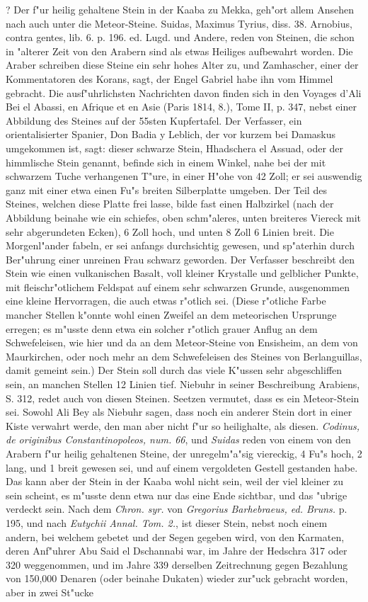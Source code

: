 \documentclass[a4paper, 11pt, oneside, polutonikogreek, german]{article}
\begin{document}
? Der f"ur heilig gehaltene Stein in der Kaaba zu Mekka, geh"ort allem Ansehen nach auch unter die Meteor-Steine. Suidas, Maximus Tyrius, diss. 38. Arnobius, contra gentes, lib. 6. p. 196. ed. Lugd. und Andere, reden von Steinen, die schon in "alterer Zeit von den Arabern sind als etwas Heiliges aufbewahrt worden. Die Araber schreiben diese Steine ein sehr hohes Alter zu, und Zamhascher, einer der Kommentatoren des Korans, sagt, der Engel Gabriel habe ihn vom Himmel gebracht. Die ausf"uhrlichsten Nachrichten davon finden sich in den Voyages d'Ali Bei el Abassi, en Afrique et en Asie (Paris 1814, 8.), Tome II, p. 347, nebst einer Abbildung des Steines auf der 55sten Kupfertafel. Der Verfasser, ein orientalisierter Spanier, Don Badia y Leblich, der vor kurzem bei Damaskus umgekommen ist, sagt: dieser schwarze Stein, Hhadschera el Assuad, oder der himmlische Stein genannt, befinde sich in einem Winkel, nahe bei der mit schwarzem Tuche verhangenen T"ure, in einer H"ohe von 42 Zoll; er sei auswendig ganz mit einer etwa einen Fu"s breiten Silberplatte umgeben. Der Teil des Steines, welchen diese Platte frei lasse, bilde fast einen Halbzirkel (nach der Abbildung beinahe wie ein schiefes, oben schm"aleres, unten breiteres Viereck mit sehr abgerundeten Ecken), 6 Zoll hoch, und unten 8 Zoll 6 Linien breit. Die Morgenl"ander fabeln, er sei anfangs durchsichtig gewesen, und sp"aterhin durch Ber"uhrung einer unreinen Frau schwarz geworden. Der Verfasser beschreibt den Stein wie einen vulkanischen Basalt, voll kleiner Krystalle und gelblicher Punkte, mit fleischr"otlichem Feldspat auf einem sehr schwarzen Grunde, ausgenommen eine kleine Hervorragen, die auch etwas r"otlich sei. (Diese r"otliche Farbe mancher Stellen k"onnte wohl einen Zweifel an dem meteorischen Ursprunge erregen; es m"usste denn etwa ein solcher r"otlich grauer Anflug an dem Schwefeleisen, wie hier und da an dem Meteor-Steine von Ensisheim, an dem von Maurkirchen, oder noch mehr an dem Schwefeleisen des Steines von Berlanguillas, damit gemeint sein.) Der Stein soll durch das viele K"ussen sehr abgeschliffen sein, an manchen Stellen 12 Linien tief. Niebuhr in seiner Beschreibung Arabiens, S. 312, redet auch von diesen Steinen. Seetzen vermutet, dass es ein Meteor-Stein sei. Sowohl Ali Bey als Niebuhr sagen, dass noch ein anderer Stein dort in einer Kiste verwahrt werde, den man aber nicht f"ur so heilighalte, als diesen. \emph{Codinus, de originibus Constantinopoleos, num. 66}, und \emph{Suidas} reden von einem von den Arabern f"ur heilig gehaltenen Steine, der unregelm"a"sig viereckig, 4 Fu"s hoch, 2 lang, und 1 breit gewesen sei, und auf einem vergoldeten Gestell gestanden habe. Das kann aber der Stein in der Kaaba wohl nicht sein, weil der viel kleiner zu sein scheint, es m"usste denn etwa nur das eine Ende sichtbar, und das "ubrige verdeckt sein. Nach dem \emph{Chron. syr.} von \emph{Gregorius Barhebraeus, ed. Bruns.} p. 195, und nach \emph{Eutychii Annal. Tom. 2.}, ist dieser Stein, nebst noch einem andern, bei welchem gebetet und der Segen gegeben wird, von den Karmaten, deren Anf"uhrer Abu Said el Dschannabi war, im Jahre der Hedschra 317 oder 320 weggenommen, und im Jahre 339 derselben Zeitrechnung gegen Bezahlung von 150,000 Denaren (oder beinahe Dukaten) wieder zur"uck gebracht worden, aber in zwei St"ucke 
\end{document}
